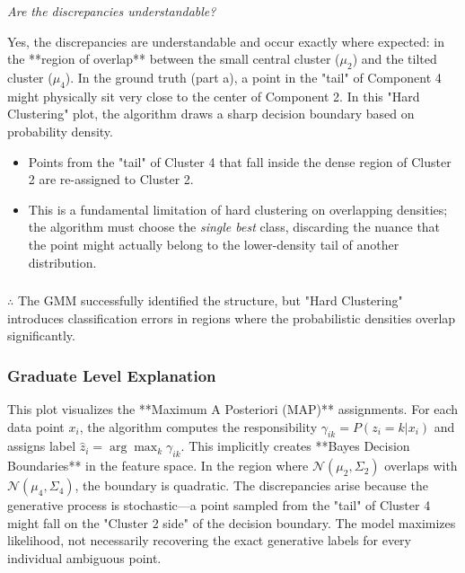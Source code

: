\documentclass{article}
\begin{document}
\begin{flushleft}
    \textit{Are the discrepancies understandable?}
\end{flushleft}
Yes, the discrepancies are understandable and occur exactly where expected: in the **region of overlap** between the small central cluster ($\mu_2$) and the tilted cluster ($\mu_4$).
In the ground truth (part a), a point in the "tail" of Component 4 might physically sit very close to the center of Component 2. In this "Hard Clustering" plot, the algorithm draws a sharp decision boundary based on probability density. 
\begin{itemize}
    \item Points from the "tail" of Cluster 4 that fall inside the dense region of Cluster 2 are re-assigned to Cluster 2.
    \item This is a fundamental limitation of hard clustering on overlapping densities; the algorithm must choose the \textit{single best} class, discarding the nuance that the point might actually belong to the lower-density tail of another distribution.
\end{itemize}

\subsubsection*{\normalfont}{$\therefore$ }
The GMM successfully identified the structure, but "Hard Clustering" introduces classification errors in regions where the probabilistic densities overlap significantly.

\subsubsection*{Graduate Level Explanation}

This plot visualizes the **Maximum A Posteriori (MAP)** assignments. For each data point $x_i$, the algorithm computes the responsibility $\gamma_{ik} = P(z_i=k|x_i)$ and assigns label $\hat{z}_i = \arg\max_k \gamma_{ik}$.
This implicitly creates **Bayes Decision Boundaries** in the feature space. In the region where $\mathcal{N}(\mu_2, \Sigma_2)$ overlaps with $\mathcal{N}(\mu_4, \Sigma_4)$, the boundary is quadratic. The discrepancies arise because the generative process is stochastic—a point sampled from the "tail" of Cluster 4 might fall on the "Cluster 2 side" of the decision boundary. The model maximizes likelihood, not necessarily recovering the exact generative labels for every individual ambiguous point.
\end{document}
